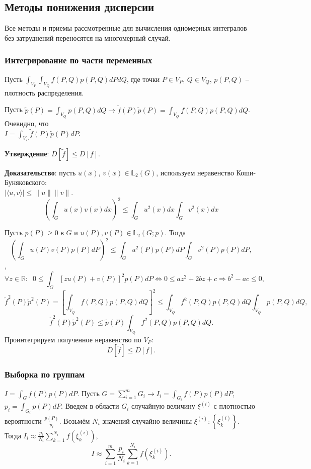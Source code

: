 \documentclass[
11pt,
master, %
subf, %
href, %
colorlinks=true, %
times, %
]{disser}
\begin{document}
\subsection{Методы понижения дисперсии}
Все методы и приемы рассмотренные для вычисления одномерных интегралов без затруднений переносятся на многомерный случай.
\subsubsection{Интегрирование по части переменных}
Пусть $\int_{V_P}\int_{V_Q} f(P,Q) p(P,Q) dPdQ$, где точки $P \in V_P$, $Q\in V_Q$, $p(P,Q)$ -- плотность
распределения.

Пусть $\tilde{p}(P) = \int_{V_Q} p(P,Q)dQ \rightarrow \tilde{f}(P)\tilde{p}(P) = \int_{V_Q} f(P,Q)p(P,Q)dQ$. Очевидно, что\\
$I = \int_{V_P} \tilde{f}(P)\tilde{p}(P)dP$.

\textbf{Утверждение}: $D[\tilde{f}] \leq D[f]$.

\textbf{Доказательство}: пусть $u(x)$, $v(x) \in \mathbb{L}_2(G)$, используем неравенство Коши-Буняковского:\\ $|\langle u, v \rangle| \leq \|u\|\|v\|$.
$$\left(\int_{G} u(x)v(x)dx\right)^2 \leq \int_{G} u^2(x)dx \int_{G} v^2(x)dx$$

Пусть $p(P) \geq 0$ в $G$ и $u(P), v(P) \in \mathbb{L}_2(G;p)$. Тогда
$$\left(\int_{G} u(P)v(P)p(P)dP\right)^2 \leq \int_{G} u^2(P)p(P)dP \int_{G} v^2(P)p(P)dP,$$,
$$\forall z \in \mathbb{R}:\;\; 0\leq \int_{G} [zu(P) + v(P)]^2p(P)dP \Longleftrightarrow 0\leq az^2 + 2bz + c \Rightarrow b^2 - ac \leq 0,$$
$$\tilde{f}^2(P) \tilde{p}^2(P) = \left[\int_{V_Q} f(P,Q) p(P,Q) dQ\right]^2 \leq \int_{V_Q} f^2(P,Q)p(P,Q)dQ\int_{V_Q} p(P,Q)dQ,$$
$$\tilde{f}^2(P)\tilde{p}^2(P) \leq \tilde{p}(P)\int_{V_Q} f^2(P,Q)p(P,Q)dQ.$$
Проинтегрируем полученное неравенство по $V_P$:
$$D[\tilde{f}] \leq D[f].$$

\subsubsection{Выборка по группам}
$I = \int_{G} f(P)p(P)dP$. Пусть $G = \sum_{i=1}^{m} G_i \rightarrow I_i = \int_{G_i}f(P)p(P)dP$, $p_i = \int_{G_i}p(P)dP$. Введем в области $G_i$ случайную величину $\xi^{(i)}$ с плотностью вероятности $\frac{p(P)}{p_i}$. Возьмём $N_i$ значений случайно величины $\xi^{(i)}:\left\{\xi_k^{(i)}\right\}$. Тогда $I_i \approx \frac{p_i}{N_i} \sum_{k=1}^{N_i} f\left(\xi_k^{(i)}\right)$,
$$I \approx \sum_{i=1}^{m} \frac{p_i}{N_i} \sum_{k=1}^{N_i}f\left(\xi_k^{(i)}\right).$$
\end{document}
